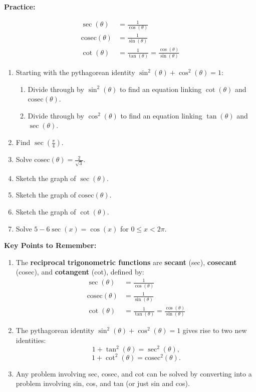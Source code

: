 \documentclass{article}
\def\cosec{\mathrm{cosec}}
\begin{document}
\clearpage





\textbf{Practice:}

\vspace{5mm}


\begin{align*}
\sec(\theta)&=\frac{1}{\cos(\theta)}\\
\cosec(\theta)&=\frac{1}{\sin(\theta)}\\
\cot(\theta)&=\frac{1}{\tan(\theta)}=\frac{\cos(\theta)}{\sin(\theta)}
\end{align*}


\vspace{5mm}

\begin{enumerate}
\item Starting with the pythagorean identity $\sin^2(\theta)+\cos^2(\theta)=1$:
	\begin{enumerate}
	\item Divide through by $\sin^2(\theta)$ to find an equation linking $\cot(\theta)$ and $\cosec(\theta)$.
	\item Divide through by $\cos^2(\theta)$ to find an equation linking $\tan(\theta)$ and $\sec(\theta)$.
	\end{enumerate}
\item Find $\sec\left(\frac{\pi}{4}\right)$.
\item Solve $\cosec(\theta)=\frac{2}{\sqrt{3}}$.
\item Sketch the graph of $\sec(\theta)$.
\item Sketch the graph of $\cosec(\theta)$.
\item Sketch the graph of $\cot(\theta)$.
\item Solve $5-6\sec(x) = \cos(x)$ for $0\leq x < 2\pi$.
\end{enumerate}










\clearpage


\textbf{Key Points to Remember:}

\begin{enumerate}
\item The \textbf{reciprocal trigonometric functions} are \textbf{secant} (sec), \textbf{cosecant} (cosec), and \textbf{cotangent} (cot), defined by:
	\begin{align*}
	\sec(\theta)&=\frac{1}{\cos(\theta)}\\
	\cosec(\theta)&=\frac{1}{\sin(\theta)}\\
	\cot(\theta)&=\frac{1}{\tan(\theta)}=\frac{\cos(\theta)}{\sin(\theta)}
	\end{align*}
\item The pythagorean identity $\sin^2(\theta)+\cos^2(\theta)=1$ gives rise to two new identities:
	\[1+\tan^2(\theta)=\sec^2(\theta),\]
	\[1+\cot^2(\theta)=\cosec^2(\theta).\]
\item Any problem involving sec, cosec, and cot can be solved by converting into a problem involving sin, cos, and tan (or just sin and cos).
\end{enumerate}
\end{document}
